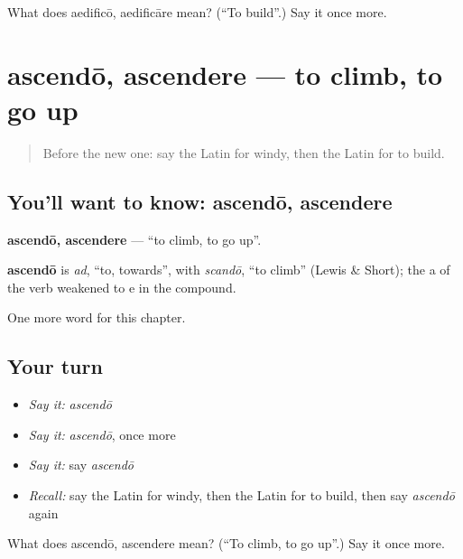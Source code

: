 \begin{tcolorbox}[breakable,colback=teal!4,colframe=teal!35!black,title={Before you move on}]
What does aedificō, aedificāre mean? (\textquotedblleft{}To build\textquotedblright{}.) Say it once more.
\end{tcolorbox}
\section[ascendō, ascendere]{ascendō, ascendere — to climb, to go up}

\label{lesson:LA-C153-ascendo}



\begin{quote}
Before the new one: say the Latin for windy, then the Latin for to build.
\end{quote}

\subsection*{You'll want to know: ascendō, ascendere}
\textbf{ascendō, ascendere} — \textquotedblleft{}to climb, to go up\textquotedblright{}.

\begin{cousinweb}
\textbf{ascendō} is \emph{ad}, \textquotedblleft{}to, towards\textquotedblright{}, with \emph{scandō}, \textquotedblleft{}to climb\textquotedblright{} (Lewis \& Short); the a of the verb weakened to e in the compound.
\end{cousinweb}

\begin{grammarlens}[title={What you've built}]
One more word for this chapter.
\end{grammarlens}

\subsection*{Your turn}
\begin{itemize}
\raggedright
  \item \emph{Say it:} \emph{ascendō}
  \item \emph{Say it:} \emph{ascendō}, once more
  \item \emph{Say it:} say \emph{ascendō}
  \item \emph{Recall:} say the Latin for windy, then the Latin for to build, then say \emph{ascendō} again
\end{itemize}

\begin{tcolorbox}[breakable,colback=teal!4,colframe=teal!35!black,title={Before you move on}]
What does ascendō, ascendere mean? (\textquotedblleft{}To climb, to go up\textquotedblright{}.) Say it once more.
\end{tcolorbox}
